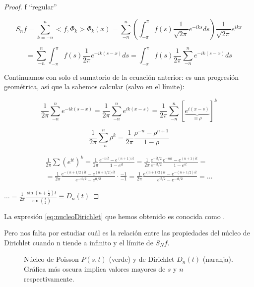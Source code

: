 	\begin{proof}

		f ``regular''

		\[S_nf = \sum_{k=-n}^{n} <f,\Phi_k> \Phi_k(x) = \sum_{-n}^n \left( \int_{-\pi}^\pi f(s) \frac{1}{\sqrt{2\pi}} e^{-iks} ds \right)  \frac{1}{\sqrt{2\pi}} e^{ikx} \]

		\[ = \sum_{-n}^{n}  \int_{-\pi}^\pi f(s) \frac{1}{2\pi} e^{-ik(s-x)} ds = \int_{-\pi}^{\pi} f(s) \frac{1}{2\pi} \sum_{-n}^n e^{-ik(s-x)} ds \]

		Continuamos con solo el sumatorio de la ecuación anterior: es una progresión geométrica, así que la sabemos calcular (salvo en el límite):

		\[ \frac{1}{2\pi} \sum_{-n}^n e^{-ik(s-x)} = \frac{1}{2\pi} \sum_{-n}^n e^{ik(x-s)} = \frac{1}{2\pi} \sum_{-n}^n \left[\underbrace{e^{i(x-s)} }_{\equiv \rho}\right]^k \]

		\[ \frac{1}{2\pi} \sum_{-n}^n \rho^k = \frac{1}{2\pi} \frac{\rho^{-n} - \rho^{n+1}}{1 -\rho} \]

		\begin{gather*}
		\frac{1}{2\pi}  \sum(e^{it})^k = \frac{1}{2\pi} \frac{e^{-nit}-e^{(n+1)it}}{1-e^{it}} = \frac{1}{2\pi} \frac{e^{-it/2}}{e^{-it/2}} \frac{ e^{-nit}-e^{(n+1)it}}{1-e^{it}} =\\
		= \frac{1}{2\pi} \frac{e^{-(n + 1/2)it}-e^{(n+1/2)it} }{e^{-it/2}-e^{it/2}} \cdot \frac{-1}{-1} = \frac{1}{2\pi} \frac{e^{(n + 1/2)it} - e^{-(n+1/2)it} }{e^{it/2}-e^{-it/2}} = \dots
		\end{gather*}

		\( … = \frac{1}{2\pi} \frac{\sin(n+ \frac{1}{2})t}{\sin(\frac{t}{2})}  \equiv D_n(t) \label{eq:nucleoDirichlet}\)
	\end{proof}

		La expresión \ref{eq:nucleoDirichlet} que hemos obtenido es conocida como .

		Pero nos falta por estudiar cuál es la relación entre las propiedades del núcleo de Dirichlet cuando n tiende a infinito y el límite de $S_N f$.



	\begin{figure}[hbtp]
	\centering
	\caption{Núcleo de Poisson $P(s,t)$ (verde)  y de Dirichlet $D_n(t)$ (naranja). Gráfica más oscura implica valores mayores de $s$ y $n$ respectivamente.}
	\label{fig:PoissonDirichlet}
	\end{figure}

